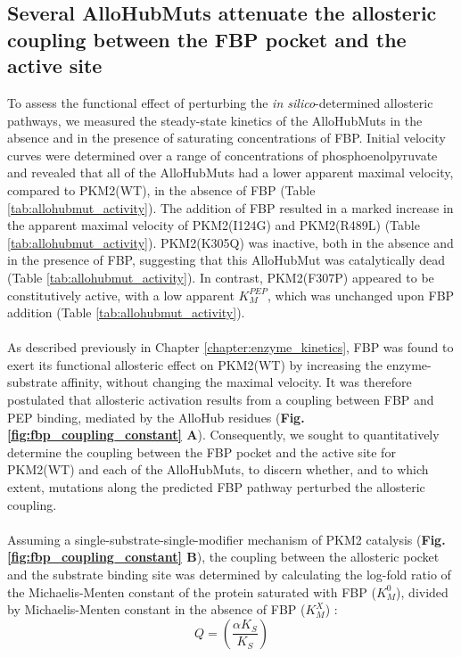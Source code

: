 \subsection{Several AlloHubMuts attenuate the allosteric coupling between the FBP pocket and the active site}
\label{subsec:allohubmuts_fbp}
To assess the functional effect of perturbing the \textit{in silico}-determined allosteric pathways, we measured the steady-state kinetics of the AlloHubMuts in the absence and in the presence of saturating concentrations of FBP. Initial velocity curves were determined over a range of concentrations of phosphoenolpyruvate and revealed that all of the AlloHubMuts had a lower apparent maximal velocity, compared to PKM2(WT), in the absence of FBP (Table \ref{tab:allohubmut_activity}). The addition of FBP resulted in a marked increase in the apparent maximal velocity of PKM2(I124G) and PKM2(R489L) (Table \ref{tab:allohubmut_activity}). PKM2(K305Q) was inactive, both in the absence and in the presence of FBP, suggesting that this AlloHubMut was catalytically dead (Table \ref{tab:allohubmut_activity}). In contrast, PKM2(F307P) appeared to be constitutively active, with a low apparent $K_{M}^{PEP}$, which was unchanged upon FBP addition (Table \ref{tab:allohubmut_activity}).
%
%
\\\\
%
%
As described previously in Chapter \ref{chapter:enzyme_kinetics}, FBP was found to exert its functional allosteric effect on PKM2(WT) by increasing the enzyme-substrate affinity, without changing the maximal velocity. It was therefore postulated that allosteric activation results from a coupling between FBP and PEP binding, mediated by the AlloHub residues (\textbf{Fig. \ref{fig:fbp_coupling_constant} A}). Consequently, we sought to quantitatively determine the coupling between the FBP pocket and the active site for PKM2(WT) and each of the AlloHubMuts, to discern whether, and to which extent, mutations along the predicted FBP pathway perturbed the allosteric coupling.
%
%
\\\\
%
%
Assuming a single-substrate-single-modifier mechanism of PKM2 catalysis (\textbf{Fig. \ref{fig:fbp_coupling_constant} B}), the coupling between the allosteric pocket and the substrate binding site was determined by calculating the log-fold ratio of the Michaelis-Menten constant of the protein saturated with FBP ($K_{M}^{0}$), divided by Michaelis-Menten constant in the absence of FBP ($K_{M}^{X}$) \cite{Reinhart:2004aa}:
%
%
\begin{equation}
Q = \left( \frac{\alpha K_{S}}{K_{S}} \right)
\end{equation}
